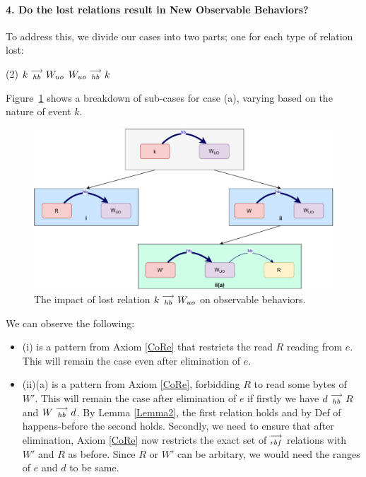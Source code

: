 \paragraph{4. Do the lost relations result in New Observable Behaviors?}

    To address this, we divide our cases into two parts; one for each type of relation lost:
    \begin{tasks}(2)
        \task $k\stackrel{\longrightarrow}{_{hb}}W_{uo}$
        \task $W_{uo}\stackrel{\longrightarrow}{_{hb}}k$
    \end{tasks}

    Figure~\ref{elim_write:case1} shows a breakdown of sub-cases for case (a), varying based
    on the nature of event $k$.
    \begin{figure}[H]
        \centering
        \includegraphics[scale=0.5]{6.Elimination/1.ValidEliminationCandidate/WriteElimProof/ProofParts/Part4Case1.pdf}
        \caption{The impact of lost relation $k\stackrel{\longrightarrow}{_{hb}}W_{uo}$ on observable behaviors.}
        \label{elim_write:case1}
    \end{figure}

    We can observe the following:
    \begin{itemize}
        \item (i) is a pattern from Axiom \ref{CoRe} that restricts the read $R$ reading from $e$. This will remain the case even after elimination of $e$.
        \item (ii)(a) is a pattern from Axiom \ref{CoRe}, forbidding $R$ to read some bytes of $W'$. 
        This will remain the case after elimination of $e$ if firstly we have $d\stackrel{\longrightarrow}{_{hb}}R$ and $W\stackrel{\longrightarrow}{_{hb}}d$.
        By Lemma \ref{Lemma2}, the first relation holds and by Def of happens-before the second holds. 
        Secondly, we need to ensure that after elimination, Axiom \ref{CoRe} now restricts the exact set of $\stackrel{\longrightarrow}{_{rbf}}$ relations with $W'$ and $R$ as before. 
        Since $R$ or $W'$ can be arbitary, we would need the ranges of $e$ and $d$ to be same.
    \end{itemize}

